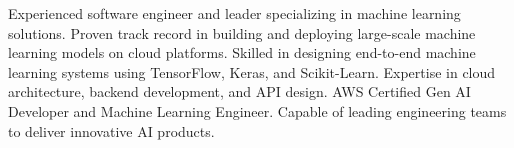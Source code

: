 \vspace{0pt}
Experienced software engineer and leader specializing in machine learning solutions. Proven track record in building and deploying large-scale machine learning models on cloud platforms. Skilled in designing end-to-end machine learning systems using TensorFlow, Keras, and Scikit-Learn. Expertise in cloud architecture, backend development, and API design. AWS Certified Gen AI Developer and Machine Learning Engineer. Capable of leading engineering teams to deliver innovative AI products.
\sectionsep